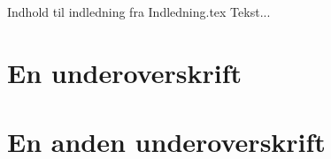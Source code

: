 Indhold til indledning fra Indledning.tex
Tekst...

\section*{En underoverskrift}
\section{En anden underoverskrift}
